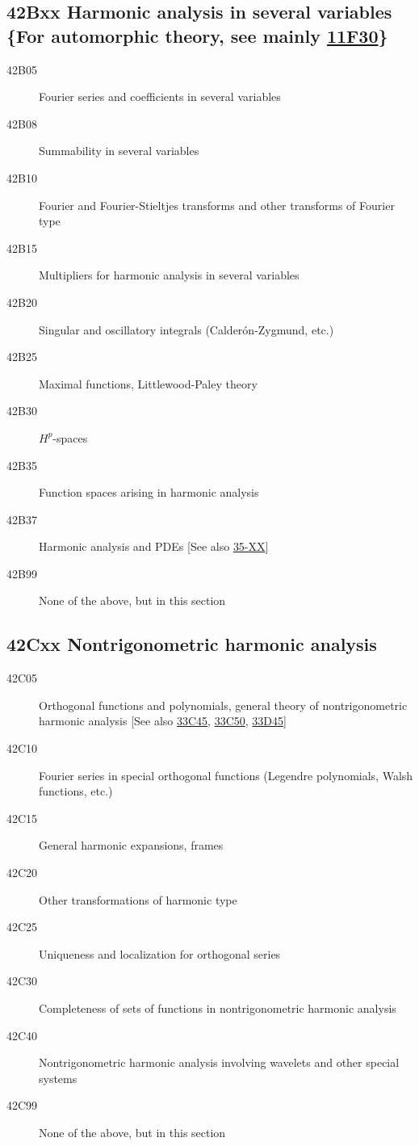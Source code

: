 \subsection*{42Bxx  Harmonic analysis in several variables \{For automorphic theory, see mainly \hyperref[11F30]{11F30}\} }\label{42Bxx}
\begin{description}  
\item [42B05]\label{42B05} Fourier series and coefficients in several variables
\item [42B08]\label{42B08} Summability in several variables
\item [42B10]\label{42B10} Fourier and Fourier-Stieltjes transforms and other transforms of Fourier type
\item [42B15]\label{42B15} Multipliers for harmonic analysis in several variables
\item [42B20]\label{42B20} Singular and oscillatory integrals (Calder\'{o}n-Zygmund, etc.)
\item [42B25]\label{42B25} Maximal functions, Littlewood-Paley theory
\item [42B30]\label{42B30} $H^p$-spaces
\item [42B35]\label{42B35} Function spaces arising in harmonic analysis
\item [42B37]\label{42B37} Harmonic analysis and PDEs [See also \hyperref[35-XX]{35-XX}]
\item [42B99]\label{42B99} None of the above, but in this section
\end{description}
\subsection*{42Cxx  Nontrigonometric harmonic analysis }\label{42Cxx}
\begin{description} 
\item [42C05]\label{42C05} Orthogonal functions and polynomials, general theory of nontrigonometric harmonic analysis [See also \hyperref[33C45]{33C45}, \hyperref[33C50]{33C50}, \hyperref[33D45]{33D45}]
\item [42C10]\label{42C10} Fourier series in special orthogonal functions (Legendre polynomials, Walsh functions, etc.)
\item [42C15]\label{42C15} General harmonic expansions, frames
\item [42C20]\label{42C20} Other transformations of harmonic type
\item [42C25]\label{42C25} Uniqueness and localization for orthogonal series
\item [42C30]\label{42C30} Completeness of sets of functions in nontrigonometric harmonic analysis
\item [42C40]\label{42C40} Nontrigonometric harmonic analysis involving wavelets and other special systems
\item [42C99]\label{42C99} None of the above, but in this section
\end{description}
